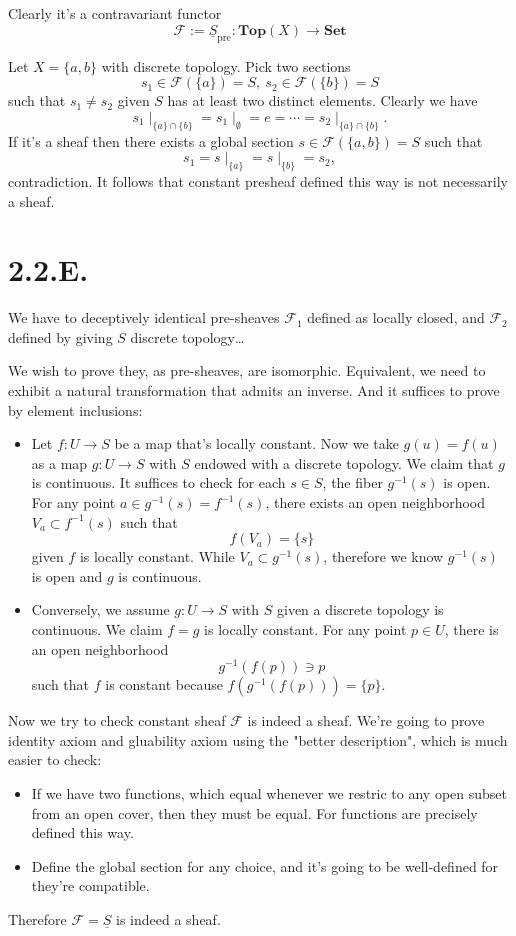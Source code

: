 Clearly it's a contravariant functor 
\[\mathscr F:=\underline{S}_{\text{pre}}:\mathbf{Top}(X)\to \mathbf{Set}\]

Let $X=\{a,b\}$ with discrete topology. Pick two sections 
\[s_1\in\mathscr F(\{a\})=S,~ s_2\in\mathscr F(\{b\})=S\] such that $s_1\neq s_2$ given $S$ has at least two distinct elements. 
Clearly we have 
\[s_1\mid_{\{a\}\cap \{b\}}=s_1\mid_{\emptyset}=e=\cdots=s_2\mid_{\{a\}\cap\{b\}}.\]
If it's a sheaf then there exists a global section $s\in\mathscr F(\{a,b\})=S$ such that 
\[s_1=s\mid_{\{a\}}=s\mid_{\{b\}}=s_2,\] contradiction. It follows that constant presheaf defined this way is not necessarily a sheaf.

\section{2.2.E.}

We have to deceptively identical pre-sheaves $\mathscr F_1$ defined as locally closed, and $\mathscr F_2$ defined by giving $S$ discrete topology\dots 

We wish to prove they, as pre-sheaves, are isomorphic. Equivalent, we need to exhibit a natural transformation that admits an inverse. And it suffices to prove by element inclusions: 
\begin{itemize}
	\item Let $f:U\to S$ be a map that's locally constant. Now we take $g(u)=f(u)$ as a map $g:U\to S$ with $S$ endowed with a discrete topology. We claim that $g$ is continuous. It suffices to check for each $s\in S$, the fiber $g^{-1}(s)$ is open. For any point $a\in g^{-1}(s)=f^{-1}(s)$, there exists an open neighborhood $V_a\subset f^{-1}(s)$ such that 
	\[f(V_a)=\{s\}\] given $f$ is locally constant. While $V_a\subset g^{-1}(s)$, therefore we know $g^{-1}(s)$ is open and $g$ is continuous. 
	\item Conversely, we assume $g:U\to S$ with $S$ given a discrete topology is continuous. We claim $f=g$ is locally constant. For any point $p\in U$, there is an open neighborhood \[g^{-1}(f(p))\ni p\] such that $f$ is constant because $f(g^{-1}(f(p)))=\{p\}$. 
\end{itemize}

Now we try to check constant sheaf $\mathscr F$ is indeed a sheaf. We're going to prove identity axiom and gluability axiom using the "better description", which is much easier to check:
\begin{itemize}
	\item If we have two functions, which equal whenever we restric to any open subset from an open cover, then they must be equal. For functions are precisely defined this way.
	\item Define the global section for any choice, and it's going to be well-defined for they're compatible.
\end{itemize}
Therefore $\mathscr F=\underline S$ is indeed a sheaf. 
 
